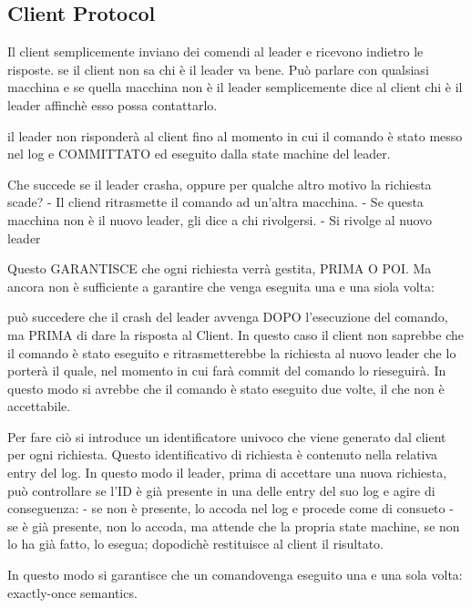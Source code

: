 \subsection{Client Protocol}

Il client semplicemente inviano dei comendi al leader e ricevono indietro le risposte.
se il client non sa chi è il leader va bene. Può parlare con qualsiasi macchina e se quella macchina non è il leader semplicemente dice al client chi è il leader affinchè esso possa contattarlo.


il leader non risponderà al client fino al momento in cui il comando è stato messo nel log e COMMITTATO ed eseguito dalla state machine del leader.


Che succede se il leader crasha, oppure per qualche altro motivo la richiesta scade?
- Il cliend ritrasmette il comando ad un'altra macchina. 
- Se questa macchina non è il nuovo leader, gli dice a chi rivolgersi.
- Si rivolge al nuovo leader

Questo GARANTISCE che ogni richiesta verrà gestita, PRIMA O POI.
 Ma ancora non è sufficiente a garantire che venga eseguita una e una siola volta:

può succedere che il crash del leader avvenga DOPO l'esecuzione del comando, ma PRIMA di dare la risposta al Client. 
In questo caso il client non saprebbe che il comando è stato eseguito e ritrasmetterebbe la richiesta al nuovo leader che lo porterà il quale, nel momento in cui farà commit del comando lo rieseguirà. In questo modo si avrebbe che il comando è stato eseguito due volte, il che non è accettabile.
 

Per fare ciò si introduce un identificatore univoco che viene generato dal client per ogni richiesta. 
Questo identificativo di richiesta è contenuto nella relativa entry del log.
In questo modo il leader, prima di accettare una nuova richiesta, può controllare se l'ID è già presente in una delle entry del suo log e agire di conseguenza:
 - se non è presente, lo accoda nel log e procede come di consueto
 - se è già presente, non lo accoda, ma attende che la propria state machine, se non lo ha già fatto, lo esegua; dopodichè restituisce al client il risultato.


In questo modo si garantisce che un comandovenga eseguito una e una sola volta: exactly-once semantics.

 


